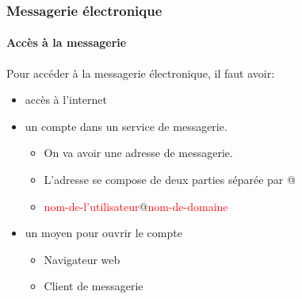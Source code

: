 \documentclass{beamer}
\begin{document}
\begin{frame}
\frametitle{Messagerie électronique}
\framesubtitle{Accès à la messagerie}

Pour accéder à la messagerie électronique, il faut avoir:
\begin{itemize}
	\item accès à l'internet
	\item un compte dans un service de messagerie.  
	\begin{itemize}
		\item On va avoir une adresse de messagerie.
		\item L'adresse se compose de deux parties séparée par @
		\item \textcolor{red}{nom-de-l'utilisateur}@\textcolor{red}{nom-de-domaine}
	\end{itemize}
	\item un moyen pour ouvrir le compte
	\begin{itemize}
		\item Navigateur web
		\item Client de messagerie 
	\end{itemize}
\end{itemize}

\end{frame}
\end{document}
